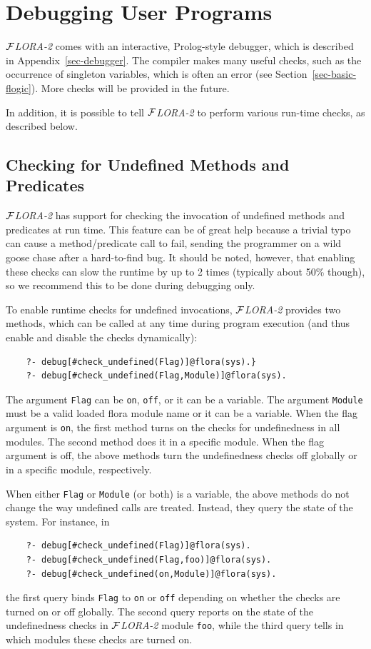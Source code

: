 \documentclass[11pt]{article}
\newcommand{\FLORA}{{\mbox{${\cal F}${\small\it LORA}\rm\emph{-2}}}\xspace}
\begin{document}
\section{Debugging User Programs}\label{sec-debugging}

\FLORA comes with an interactive, Prolog-style debugger, which is described
in Appendix~\ref{sec-debugger}. The compiler makes many useful checks, such
as the occurrence of singleton variables, which is often an error (see
Section~\ref{sec-basic-flogic}). More checks will be provided in the future.

In addition, it is possible to tell \FLORA to perform various run-time
checks, as described below.

\subsection{Checking for Undefined Methods and Predicates}\label{sec-undef}

\FLORA has support for checking the invocation of undefined methods and
predicates at run time. This feature can be of great help because a trivial
typo can cause a method/predicate call to fail, sending the programmer on a
wild goose chase after a hard-to-find bug. It should be noted, however,
that enabling these checks can slow the runtime by up to 2 times (typically
about 50\% though), so we recommend this to be done during debugging only.

To enable runtime checks for undefined invocations, \FLORA provides two
methods, which can be called at any time during program execution (and thus
enable and disable the checks dynamically):
\begin{verbatim}
    ?- debug[#check_undefined(Flag)]@flora(sys).}
    ?- debug[#check_undefined(Flag,Module)]@flora(sys).
\end{verbatim}
The argument {\tt Flag} can be {\tt on}, {\tt off}, or it can be a variable.
The argument {\tt Module} must be a valid loaded flora module name 
or it can be a variable. When the flag argument is {\tt on}, the first
method turns on the checks for undefinedness in all modules. The second
method does it in a specific module. When the flag argument is off, the
above methods turn the undefinedness checks off globally or in a specific
module, respectively.

When either {\tt Flag} or {\tt Module} (or both) is a variable, the above
methods do not change the way undefined calls are treated. Instead, they
query the state of the system. For instance, in
\begin{verbatim}
    ?- debug[#check_undefined(Flag)]@flora(sys).
    ?- debug[#check_undefined(Flag,foo)]@flora(sys).
    ?- debug[#check_undefined(on,Module)]@flora(sys).
\end{verbatim}
the first query binds {\tt Flag} to {\tt on} or {\tt off} depending on
whether the checks are turned on or off globally. The second query reports
on the state of the undefinedness checks in \FLORA module {\tt foo}, while
the third query tells in which modules these checks are turned on.
\end{document}
